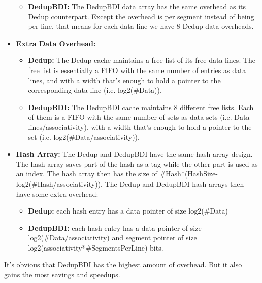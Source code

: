\begin{itemize}
\begin{itemize}
        \item \textbf{DedupBDI:} The DedupBDI data array has the same overhead as its Dedup counterpart. Except the overhead is per segment instead of being per line. that means for each data line we have 8 Dedup data overheads.
    \end{itemize}
    \item \textbf{Extra Data Overhead:}
    \begin{itemize}
        \item \textbf{Dedup:} The Dedup cache maintains a free list of its free data lines. The free list is essentially a FIFO with the same number of entries as data lines, and with a width that's enough to hold a pointer to the corresponding data line (i.e. log2(\#Data)).
        \item \textbf{DedupBDI:} The DedupBDI cache maintains 8 different free lists. Each of them is a FIFO with the same number of sets as data sets (i.e. Data lines/associativity), with a width that's enough to hold a pointer to the set (i.e. log2(\#Data/associativity)).
    \end{itemize}
    \item \textbf{Hash Array:} The Dedup and DedupBDI have the same hash array design. The hash array saves part of the hash as a tag while the other part is used as an index. The hash array then has the size of \#Hash*(HashSize-log2(\#Hash/associativity)). The Dedup and DedupBDI hash arrays then have some extra overhead:
    \begin{itemize}
        \item \textbf{Dedup:} each hash entry has a data pointer of size log2(\#Data)
        \item \textbf{DedupBDI:} each hash entry has a data pointer of size log2(\#Data/associativity) and segment pointer of size log2(associativity*\#SegmentsPerLine) bits.
    \end{itemize}
\end{itemize}
It's obvious that DedupBDI has the highest amount of overhead. But it also gains the most savings and speedups.

